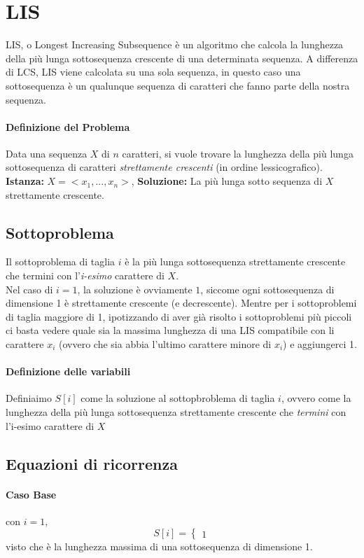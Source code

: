 \section{LIS}
LIS, o Longest Increasing Subsequence è un algoritmo che calcola la lunghezza della più lunga sottosequenza crescente di una determinata sequenza.
A differenza di LCS, LIS viene calcolata su una sola sequenza, in questo caso una sottosequenza è un qualunque sequenza di caratteri che fanno parte della nostra sequenza.

\paragraph*{Definizione del Problema}
Data una sequenza $X$ di $n$ caratteri, si vuole trovare la lunghezza della più lunga sottosequenza di caratteri \emph{strettamente crescenti} (in ordine lessicografico).
\\\textbf{Istanza:} $X=<x_1,...,x_n>$, \textbf{Soluzione:} La più lunga sotto sequenza di $X$ strettamente crescente.


\subsection*{Sottoproblema} Il sottoproblema di taglia $i$ è la più lunga sottosequenza strettamente crescente che termini con l'\emph{i-esimo} carattere di $X$.
\\Nel caso di $i=1$, la soluzione è ovviamente $1$, siccome ogni sottosequenza di dimensione 1 è strettamente crescente (e decrescente).
Mentre per i sottoproblemi di taglia maggiore di 1, ipotizzando di aver già risolto i sottoproblemi più piccoli ci basta vedere quale sia la massima lunghezza di una LIS compatibile con li carattere $x_i$ (ovvero che sia abbia l'ultimo carattere minore di $x_i$)
e aggiungerci 1.

\paragraph{Definizione delle variabili}
Definiaimo $S[i]$ come la soluzione al sottopbroblema di taglia $i$, ovvero come la lunghezza della 
più lunga sottosequenza strettamente crescente che \emph{termini} con l'i-esimo carattere di $X$

\subsection*{Equazioni di ricorrenza}
\paragraph*{Caso Base} con $i=1$,
 $$S[i]=\begin{cases}
	 1
 \end{cases}$$
visto che è la lunghezza massima di una sottosequenza di dimensione 1.
